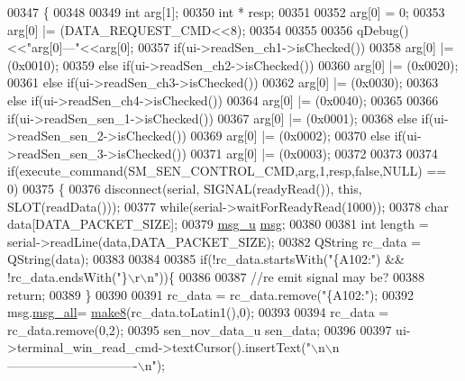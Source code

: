\begin{DoxyCode}
00347 \{
00348 
00349     \textcolor{keywordtype}{int} arg[1];
00350     \textcolor{keywordtype}{int} * resp;
00351 
00352    arg[0] = 0;
00353    arg[0] |= (DATA\_REQUEST\_CMD<<8);
00354 
00355 
00356    qDebug()<<\textcolor{stringliteral}{"arg[0]---"}<<arg[0];
00357    \textcolor{keywordflow}{if}(ui->readSen\_ch1->isChecked())
00358    arg[0] |= (0x0010);
00359    \textcolor{keywordflow}{else} \textcolor{keywordflow}{if}(ui->readSen\_ch2->isChecked())
00360    arg[0] |= (0x0020);
00361    \textcolor{keywordflow}{else} \textcolor{keywordflow}{if}(ui->readSen\_ch3->isChecked())
00362    arg[0] |= (0x0030);
00363    \textcolor{keywordflow}{else} \textcolor{keywordflow}{if}(ui->readSen\_ch4->isChecked())
00364    arg[0] |= (0x0040);
00365 
00366    \textcolor{keywordflow}{if}(ui->readSen\_sen\_1->isChecked())
00367    arg[0] |= (0x0001);
00368    \textcolor{keywordflow}{else} \textcolor{keywordflow}{if}(ui->readSen\_sen\_2->isChecked())
00369    arg[0] |= (0x0002);
00370    \textcolor{keywordflow}{else} \textcolor{keywordflow}{if}(ui->readSen\_sen\_3->isChecked())
00371    arg[0] |= (0x0003);
00372 
00373 
00374     \textcolor{keywordflow}{if}(execute\_command(SM\_SEN\_CONTROL\_CMD,arg,1,resp,\textcolor{keyword}{false},NULL) == 0)
00375     \{
00376       disconnect(serial, SIGNAL(readyRead()), \textcolor{keyword}{this}, SLOT(readData()));
00377       \textcolor{keywordflow}{while}(serial->waitForReadyRead(1000));
00378       \textcolor{keywordtype}{char} data[DATA\_PACKET\_SIZE];
00379       \hyperlink{a00004_d5/de9/a00176}{msg\_u} \hyperlink{a00017_a6134b74dbfffbaf333e169bd09597b53}{msg};
00380 
00381       \textcolor{keywordtype}{int} length = serial->readLine(data,DATA\_PACKET\_SIZE);
00382       QString rc\_data = QString(data);
00383 
00384 
00385       \textcolor{keywordflow}{if}(!rc\_data.startsWith(\textcolor{stringliteral}{"\{A102:"}) && !rc\_data.endsWith(\textcolor{stringliteral}{"\}\(\backslash\)r\(\backslash\)n"}))\{
00386 
00387           \textcolor{comment}{//re emit signal may be?}
00388           \textcolor{keywordflow}{return};
00389       \}
00390 
00391       rc\_data = rc\_data.remove(\textcolor{stringliteral}{"\{A102:"});
00392       msg.\hyperlink{a00004_a2763c4336b9376a5385ff279ba0a6591}{msg\_all}= \hyperlink{a00017_aebce94d5e6af7afff661daf74b208de1}{make8}(rc\_data.toLatin1(),0);
00393 
00394       rc\_data = rc\_data.remove(0,2);
00395       sen\_nov\_data\_u sen\_data;
00396 
00397        ui->terminal\_win\_read\_cmd->textCursor().insertText(\textcolor{stringliteral}{"\(\backslash\)n\(\backslash\)n-------------------------------\(\backslash\)n"});

\end{DoxyCode}

